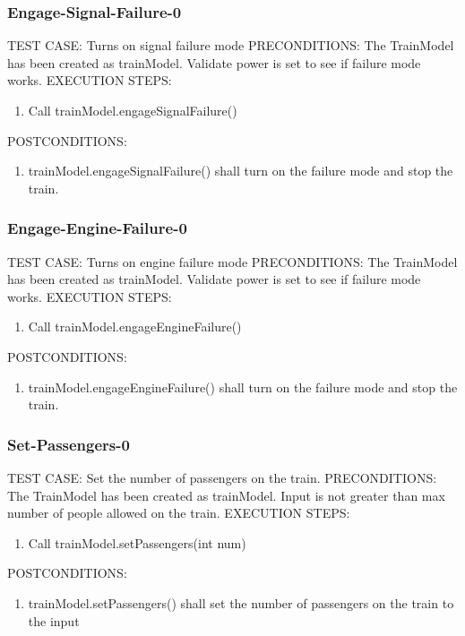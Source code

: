 \documentclass{scrreprt}
\begin{document}
\subsubsection{Engage-Signal-Failure-0}
TEST CASE: Turns on signal failure mode
PRECONDITIONS: The TrainModel has been created as trainModel. Validate power is set to see if failure mode works.
EXECUTION STEPS:
\begin{enumerate}
	\item Call trainModel.engageSignalFailure()
\end{enumerate}
POSTCONDITIONS:
\begin{enumerate}
	\item trainModel.engageSignalFailure() shall turn on the failure mode and stop the train.
\end{enumerate}

\subsubsection{Engage-Engine-Failure-0}
TEST CASE: Turns on engine failure mode
PRECONDITIONS: The TrainModel has been created as trainModel. Validate power is set to see if failure mode works.
EXECUTION STEPS:
\begin{enumerate}
	\item Call trainModel.engageEngineFailure()
\end{enumerate}
POSTCONDITIONS:
\begin{enumerate}
	\item trainModel.engageEngineFailure() shall turn on the failure mode and stop the train.
\end{enumerate}

\subsubsection{Set-Passengers-0}
TEST CASE: Set the number of passengers on the train.
PRECONDITIONS: The TrainModel has been created as trainModel. Input is not greater than max number of people allowed on the train.
EXECUTION STEPS:
\begin{enumerate}
	\item Call trainModel.setPassengers(int num)
\end{enumerate}
POSTCONDITIONS:
\begin{enumerate}
	\item trainModel.setPassengers() shall set the number of passengers on the train to the input
\end{enumerate}
\end{document}
